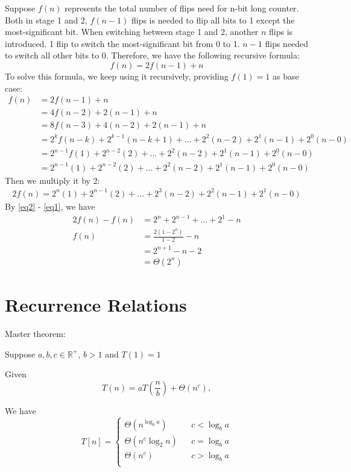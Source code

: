 \documentclass[11pt]{article}
\begin{document}
Suppose $f(n)$ represents the total number of flips need for n-bit long counter. Both in stage 1 and 2, $f(n-1)$ flips is needed to flip all bits to 1 except the most-significant bit. When switching between stage 1 and 2, another $n$ flips is introduced. 1 flip to switch the most-significant bit from 0 to 1. $n-1$ flips needed to switch all other bits to 0. Therefore, we have the following recursive formula:
\[
	f(n) = 2f(n-1) + n
\]
To solve this formula, we keep using it recursively, providing $f(1) = 1$ as base case:
 \begin{align}
 	f(n) 	&= 2f(n-1) + n \nonumber \\
		&= 4f(n-2) + 2(n-1) + n \nonumber \\
		&= 8f(n-3) + 4(n-2) + 2(n-1) + n \nonumber \\
		&= 2^kf(n-k) + 2^{k-1}(n-k+1) + \ldots + 2^2(n-2) + 2^1(n-1) + 2^0(n-0) \nonumber \\
		&= 2^{n-1}f(1) + 2^{n-2}(2) + \ldots + 2^2(n-2) + 2^1(n-1) + 2^0(n-0) \nonumber  \\
		&= 2^{n-1}(1) + 2^{n-2}(2) + \ldots + 2^2(n-2) + 2^1(n-1) + 2^0(n-0) \label{eq1} 
 \end{align}
Then we multiply it by 2:
 \begin{align}
	2f(n) =  2^{n}(1) + 2^{n-1}(2) + \ldots + 2^3(n-2) + 2^2(n-1) + 2^1(n-0) \label{eq2}  
 \end{align}
By \eqref{eq2} - \eqref{eq1}, we have
 \begin{align*}
 	2f(n) - f(n) &= 2^n + 2^{n-1} + \ldots + 2^1 -n \\
	f(n)		&= \frac{2(1-2^n)}{1-2} - n \\
			&= 2^{n+1} - n - 2 \\
			&= \Theta(2^n)
  \end{align*}
  
  \newpage
  \section{Recurrence Relations}
 Master theorem:
 
Suppose $a, b, c \in \mathbb{R}^+$, $b > 1$ and $T(1)=1$

Given
 \begin{equation*}
 T(n) = aT(\frac{n}{b}) + \Theta(n^c),
 \end{equation*}
 
 We have
\[
 T[n]=\left\{
\begin{array}{lcl}
\Theta(n^{\log_ba})      &      & c < \log_ba\\
\Theta(n^c\log_2n)    &      & c = \log_ba\\
\Theta(n^c)     &      & c > \log_ba\\
\end{array} \right. 
\]
\end{document}
